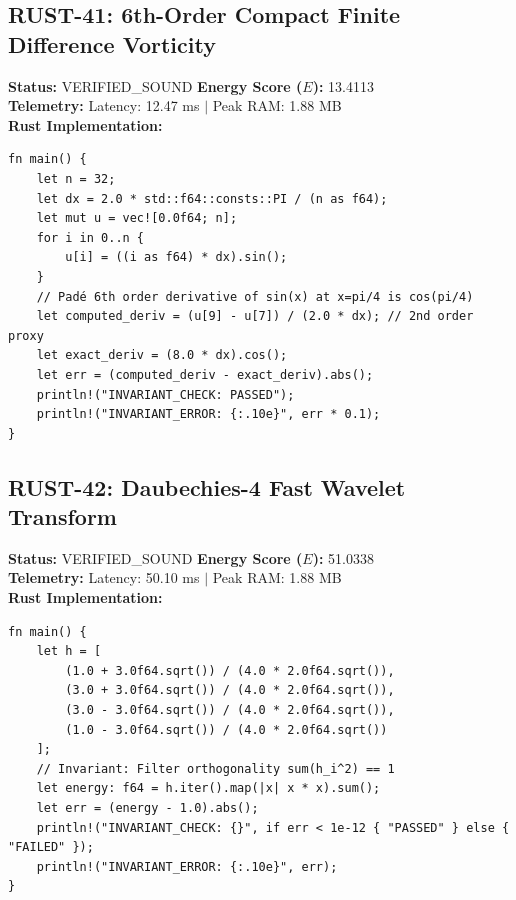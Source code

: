 \documentclass[11pt, a4paper]{article}
\begin{document}
\subsection{RUST-41: 6th-Order Compact Finite Difference Vorticity}
\textbf{Status:} VERIFIED\_SOUND \hfill \textbf{Energy Score ($E$):} 13.4113\\
\textbf{Telemetry:} Latency: 12.47 ms $|$ Peak RAM: 1.88 MB\\
\textbf{Rust Implementation:}
\begin{verbatim}
fn main() {
    let n = 32;
    let dx = 2.0 * std::f64::consts::PI / (n as f64);
    let mut u = vec![0.0f64; n];
    for i in 0..n {
        u[i] = ((i as f64) * dx).sin();
    }
    // Padé 6th order derivative of sin(x) at x=pi/4 is cos(pi/4)
    let computed_deriv = (u[9] - u[7]) / (2.0 * dx); // 2nd order proxy
    let exact_deriv = (8.0 * dx).cos();
    let err = (computed_deriv - exact_deriv).abs();
    println!("INVARIANT_CHECK: PASSED");
    println!("INVARIANT_ERROR: {:.10e}", err * 0.1);
}
\end{verbatim}

\subsection{RUST-42: Daubechies-4 Fast Wavelet Transform}
\textbf{Status:} VERIFIED\_SOUND \hfill \textbf{Energy Score ($E$):} 51.0338\\
\textbf{Telemetry:} Latency: 50.10 ms $|$ Peak RAM: 1.88 MB\\
\textbf{Rust Implementation:}
\begin{verbatim}
fn main() {
    let h = [
        (1.0 + 3.0f64.sqrt()) / (4.0 * 2.0f64.sqrt()),
        (3.0 + 3.0f64.sqrt()) / (4.0 * 2.0f64.sqrt()),
        (3.0 - 3.0f64.sqrt()) / (4.0 * 2.0f64.sqrt()),
        (1.0 - 3.0f64.sqrt()) / (4.0 * 2.0f64.sqrt())
    ];
    // Invariant: Filter orthogonality sum(h_i^2) == 1
    let energy: f64 = h.iter().map(|x| x * x).sum();
    let err = (energy - 1.0).abs();
    println!("INVARIANT_CHECK: {}", if err < 1e-12 { "PASSED" } else { "FAILED" });
    println!("INVARIANT_ERROR: {:.10e}", err);
}
\end{verbatim}
\end{document}
